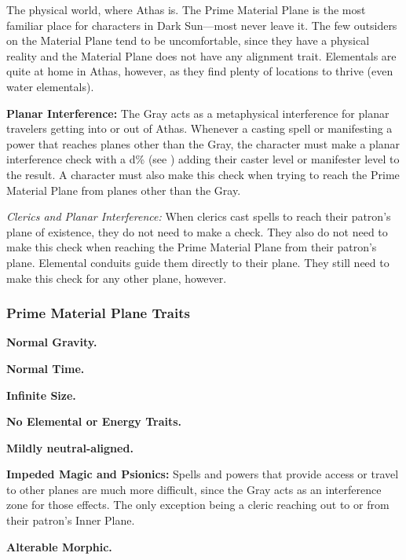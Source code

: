 The physical world, where Athas is. The Prime Material Plane is the most familiar place for characters in {\tableheader Dark Sun}---most never leave it. The few outsiders on the Material Plane tend to be uncomfortable, since they have a physical reality and the Material Plane does not have any alignment trait. Elementals are quite at home in Athas, however, as they find plenty of locations to thrive (even water elementals).

\textbf{Planar Interference:} The Gray acts as a metaphysical interference for planar travelers getting into or out of Athas. Whenever a casting spell or manifesting a power that reaches planes other than the Gray, the character must make a planar interference check with a d\% (see ) adding their caster level or manifester level to the result. A character must also make this check when trying to reach the Prime Material Plane from planes other than the Gray.


\textit{Clerics and Planar Interference:} When clerics cast spells to reach their patron's plane of existence, they do not need to make a check. They also do not need to make this check when reaching the Prime Material Plane from their patron's plane. Elemental conduits guide them directly to their plane. They still need to make this check for any other plane, however.

\subsubsection{Prime Material Plane Traits}
\begin{itemize*}
\item \textbf{Normal Gravity.}
\item \textbf{Normal Time.}
\item \textbf{Infinite Size.}
\item \textbf{No Elemental or Energy Traits.}
\item \textbf{Mildly neutral-aligned.}
\item \textbf{Impeded Magic and Psionics:} Spells and powers that provide access or travel to other planes are much more difficult, since the Gray acts as an interference zone for those effects. The only exception being a cleric reaching out to or from their patron's Inner Plane.
\item \textbf{Alterable Morphic.}
\end{itemize*}
